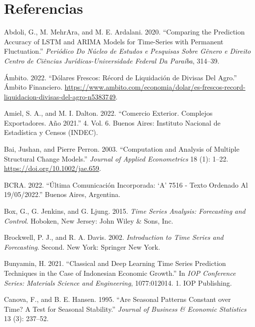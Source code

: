 \documentclass[
  12pt, a4paper, oneside]{article}
\newlength{\cslhangindent}
\newenvironment{CSLReferences}[2] %
 {\begin{list}{}{%
  \setlength{\itemindent}{0pt}
  \setlength{\leftmargin}{0pt}
  \setlength{\parsep}{0pt}
  \ifodd #1
   \setlength{\leftmargin}{\cslhangindent}
   \setlength{\itemindent}{-1\cslhangindent}
  \fi
  \setlength{\itemsep}{#2\baselineskip}}}
 {\end{list}}
\begin{document}
\section*{Referencias}\label{referencias}

\label{refs}
\begin{CSLReferences}{1}{0}
Abdoli, G., M. MehrAra, and M. E. Ardalani. 2020. {``Comparing the Prediction Accuracy of LSTM and ARIMA Models for Time-Series with Permanent Fluctuation.''} \emph{Periódico Do Núcleo de Estudos e Pesquisas Sobre Gênero e Direito Centro de Ciências Jurídicas-Universidade Federal Da Paraíba}, 314--39.

Ámbito. 2022. {``Dólares Frescos: Récord de Liquidación de Divisas Del Agro.''} Ámbito Financiero. \url{https://www.ambito.com/economia/dolar/es-frescos-record-liquidacion-divisas-del-agro-n5383749}.

Amiel, S. A., and M. I. Dalton. 2022. {``Comercio Exterior. Complejos Exportadores. Año 2021.''} 4. Vol. 6. Buenos Aires: Instituto Nacional de Estadística y Censos (INDEC).

Bai, Jushan, and Pierre Perron. 2003. {``Computation and Analysis of Multiple Structural Change Models.''} \emph{Journal of Applied Econometrics} 18 (1): 1--22. \url{https://doi.org/10.1002/jae.659}.

BCRA. 2022. {``Última Comunicación Incorporada: {`A'} 7516 - Texto Ordenado Al 19/05/2022.''} Buenos Aires, Argentina.

Box, G., G. Jenkins, and G. Ljung. 2015. \emph{Time Series Analysis: Forecasting and Control}. Hoboken, New Jersey: John Wiley \& Sons, Inc.

Brockwell, P. J., and R. A. Davis. 2002. \emph{Introduction to Time Series and Forecasting}. Second. New York: Springer New York.

Bunyamin, H. 2021. {``Classical and Deep Learning Time Series Prediction Techniques in the Case of Indonesian Economic Growth.''} In \emph{IOP Conference Series: Materials Science and Engineering}, 1077:012014. 1. IOP Publishing.

Canova, F., and B. E. Hansen. 1995. {``Are Seasonal Patterns Constant over Time? A Test for Seasonal Stability.''} \emph{Journal of Business \& Economic Statistics} 13 (3): 237--52.


\end{CSLReferences}
\end{document}
